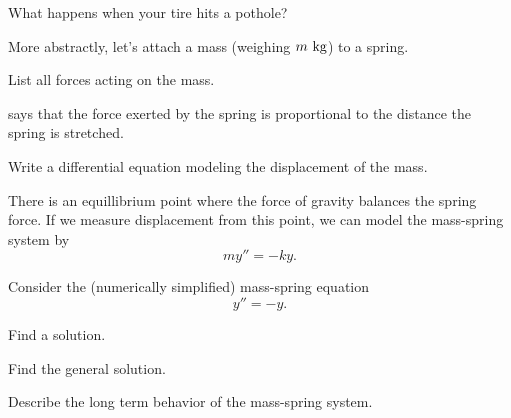 
\begin{applicationActivities}

\begin{observation}
What happens when your tire hits a pothole?



\end{observation}

\begin{activity}{5}
More abstractly, let's attach a mass (weighing \(m\ {\rm kg}\)) to a spring.

\begin{center}
\springmass
\end{center}
\vfill
List all forces acting on the mass.
\end{activity}

\begin{activity}{5}
 says that the force exerted by the spring is proportional to the distance the spring is stretched.

\begin{center}
\springmass
\end{center}
\vfill
Write a differential equation modeling the displacement of the mass.
\end{activity}

\begin{observation}
There is an equillibrium point where the force of gravity balances the spring force.  If we measure displacement from this point, we can model the mass-spring system by
\[my''=-ky.\]
\vfill
\begin{center}
\springmass
\end{center}
\end{observation}

\begin{activity}{15}
Consider the (numerically simplified) mass-spring equation \[y''=-y.\]
\begin{subactivity}
Find a solution.
\end{subactivity}
\begin{subactivity}
Find the general solution.
\end{subactivity}
\begin{subactivity}
Describe the long term behavior of the mass-spring system.
\end{subactivity}
\end{activity}


\end{applicationActivities}
